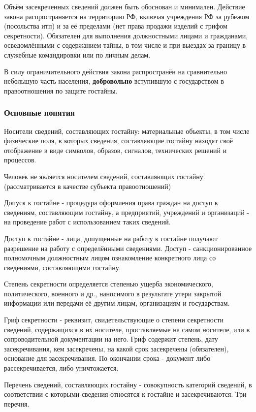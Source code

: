 \documentclass[a4paper,12pt]{report}
\begin{document}
	Объём засекреченных сведений должен быть обоснован и минимален.
	Действие закона распространяется на территорию РФ, включая учреждения РФ за рубежом (посольства итп) и за её пределами (нет права продажи изделий с грифом секретности). Обязателен для выполнения должностными лицами и гражданами, осведомлёнными с содержанием тайны, в том числе и при выездах за границу в служебные командировки или по личным делам.

	В силу ограничительного действия закона распространён на сравнительно небольшую часть населения, \textbf{добровольно} вступившую с государством в правоотношения по защите гостайны.

	\subsubsection{Основные понятия}
	Носители сведений, составляющих гостайну: материальные объекты, в том числе физические поля,  в которых сведения, составляющие гостайну находят своё отображение в виде символов, образов, сигналов, технических решений и процессов.

	Человек не является носителем сведений, составляющих гостайну. (рассматривается в качестве субъекта правоотношений)

	Допуск к гостайне - процедура оформления права граждан на доступ к сведениям, составляющим гостайну, а предприятий, учреждений и организаций - на проведение работ с использованием таких сведений.

	Доступ к гостайне - лица, допущенные на работу к гостайне получают разрешение на работу с определёнными сведениями.
	Доступ - санкционированное полномочным должностным лицом ознакомление конкретного лица со сведениями, составляющими гостайну.

	Степень секретности определяется степенью ущерба экономического, политического, военного и др., наносимого в результате утери закрытой информации или передачи её другим лицам, организациям и государствам.

	Гриф секретности - реквизит, свидетельствующие о степени секретности сведений, содержащихся в их носителе, проставляемые на самом носителе, или в сопроводительной документации на него. Гриф содержит степень, дату засекречивания, кем засекречены, на какой срок засекречены (обязателен), основание для засекречивания. По окончании срока - документ либо рассекречивается, либо уничтожается.

	Перечень сведений, составляющих гостайну - совокупность категорий сведений, в соответствии с которыми сведения относятся к гостайне и засекречиваются. Три перечня.
\end{document}
